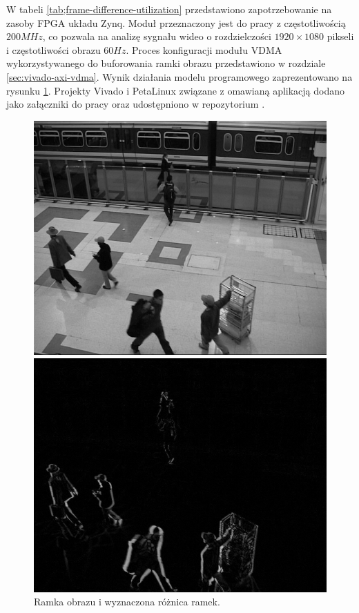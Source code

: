 W tabeli \ref{tab;frame-difference-utilization} przedstawiono zapotrzebowanie na zasoby FPGA układu Zynq.
Moduł przeznaczony jest do pracy z częstotliwością $200MHz$, co pozwala na analizę sygnału wideo o rozdzielczości $1920 \times 1080$ pikseli i częstotliwości obrazu $60Hz$.
Proces konfiguracji modułu VDMA wykorzystywanego do buforowania ramki obrazu przedstawiono w rozdziale \ref{sec:vivado-axi-vdma}.
Wynik działania modelu programowego zaprezentowano na rysunku \ref{fig:frame-difference-result}. 
Projekty Vivado i PetaLinux związane z omawianą aplikacją dodano jako załączniki do pracy oraz udostępniono w repozytorium \cite{git-repository}.
\begin{figure}[H]
	\centering
	\begin{minipage}[b]{0.49\textwidth}
		\includegraphics[width=\textwidth]{img/fd-frame.png}
	\end{minipage}
	\hfill
	\begin{minipage}[b]{0.49\textwidth}
		\includegraphics[width=\textwidth]{img/fd-diff.png}
	\end{minipage}
	\caption{Ramka obrazu i wyznaczona różnica ramek.}
	\label{fig:frame-difference-result}
\end{figure}
